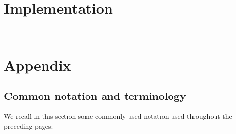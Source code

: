 \documentclass[11pt]{report}
\begin{document}
\chapter{Implementation}
\label{chap:implementation}

\

\chapter{Appendix}

\section{Common notation and terminology}

We recall in this section some commonly used notation used throughout the preceding pages:
\end{document}
